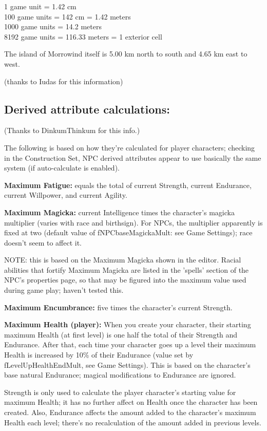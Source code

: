 \documentclass[
]{article}
\begin{document}
1 game unit = 1.42 cm\\
100 game units = 142 cm = 1.42 meters\\
1000 game units = 14.2 meters\\
8192 game units = 116.33 meters = 1 exterior cell

The island of Morrowind itself is 5.00 km north to south and 4.65 km
east to west.

(thanks to Iudas for this information)

\hypertarget{derived-attribute-calculations}{%
\subsection{Derived attribute
calculations:}\label{derived-attribute-calculations}}

(Thanks to DinkumThinkum for this info.)

The following is based on how they're calculated for player characters;
checking in the Construction Set, NPC derived attributes appear to use
basically the same system (if auto-calculate is enabled).

\textbf{Maximum Fatigue:} equals the total of current Strength, current
Endurance, current Willpower, and current Agility.

\textbf{Maximum Magicka:} current Intelligence times the character's
magicka multiplier (varies with race and birthsign). For NPCs, the
multiplier apparently is fixed at two (default value of
fNPCbaseMagickaMult: see Game Settings); race doesn't seem to affect it.

NOTE: this is based on the Maximum Magicka shown in the editor. Racial
abilities that fortify Maximum Magicka are listed in the 'spells'
section of the NPC's properties page, so that may be figured into the
maximum value used during game play; haven't tested this.

\textbf{Maximum Encumbrance:} five times the character's current
Strength.

\textbf{Maximum Health (player):} When you create your character, their
starting maximum Health (at first level) is one half the total of their
Strength and Endurance. After that, each time your character goes up a
level their maximum Health is increased by 10\% of their Endurance
(value set by fLevelUpHealthEndMult, see Game Settings). This is based
on the character's base natural Endurance; magical modifications to
Endurance are ignored.

Strength is only used to calculate the player character's starting value
for maximum Health; it has no further affect on Health once the
character has been created. Also, Endurance affects the amount added to
the character's maximum Health each level; there's no recalculation of
the amount added in previous levels.
\end{document}
